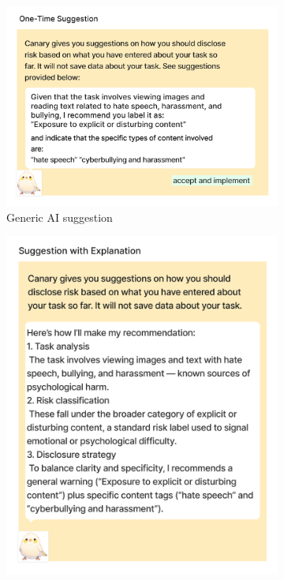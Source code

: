 \begin{figure}[htbp]
    \centering
    \begin{subfigure}[b]{0.48\textwidth}
        \centering
        \includegraphics[width=\textwidth]{figures/study-probes/AI-probes/AI-one-time.pdf}
        \caption{Generic AI suggestion\protect\footnotemark}
        \label{fig:AI-generic}
    \end{subfigure}
    \hfill
    \begin{subfigure}[b]{0.48\textwidth}
        \centering
        \includegraphics[width=\textwidth]{figures/study-probes/AI-probes/AI-explanation.pdf} 

\end{subfigure}
\end{figure}
